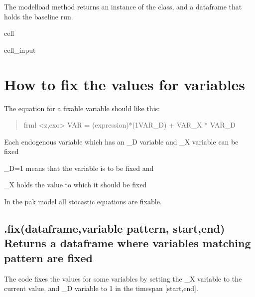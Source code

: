 \documentclass[letterpaper,10pt,english]{jupyterBook}
\begin{document}
\sphinxAtStartPar
The modelload method returns an instance  of the  class, and a dataframe  that holds the baseline run.

\begin{sphinxuseclass}{cell}\begin{sphinxVerbatimInput}

\begin{sphinxuseclass}{cell_input}
\begin{sphinxVerbatim}[commandchars=\\\{\}]
  
\end{sphinxVerbatim}

\end{sphinxuseclass}\end{sphinxVerbatimInput}

\end{sphinxuseclass}

\section{How to fix the values for variables}
\label{\detokenize{content/howto/fixing/Fixing variables:how-to-fix-the-values-for-variables}}
\sphinxAtStartPar
The equation for a fixable variable should like this:
\begin{quote}

\sphinxAtStartPar
frml <z,exo> VAR  = (expression)*(1\sphinxhyphen{}VAR\_D) + VAR\_X * VAR\_D
\end{quote}

\sphinxAtStartPar
Each endogenous variable which has an \_D variable and \_X variable can be fixed

\sphinxAtStartPar
\_D=1 means that the variable is to be fixed and

\sphinxAtStartPar
\_X holds the value to which it should be fixed

\sphinxAtStartPar
In the pak model all stocastic equations are fixable.


\subsection{.fix(dataframe,variable pattern, start,end) Returns a dataframe where variables matching pattern are fixed}
\label{\detokenize{content/howto/fixing/Fixing variables:fix-dataframe-variable-pattern-start-end-returns-a-dataframe-where-variables-matching-pattern-are-fixed}}
\sphinxAtStartPar
The code fixes the values for some variables by setting the \_X variable to the current value, and \_D variable to 1 in the timespan {[}start,end{]}.
\end{document}
